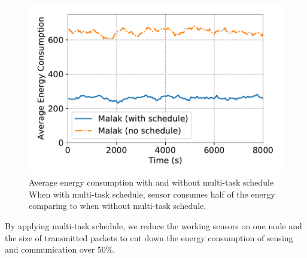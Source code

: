 \begin{figure}[htbp]
	\centering
	\includegraphics[width=.95\columnwidth]{Figure/multitask_energy}
	\vspace{-0.1in}
	\caption{Average energy consumption with and without multi-task schedule
		\textnormal{When with multi-task schedule, sensor consumes half of the energy
			comparing to when without multi-task schedule.}}
	\label{fig:multitask_energy}
\end{figure}

By applying multi-task schedule, we reduce the working sensors on one node and
the size of transmitted packets to cut down the energy consumption of sensing
and communication over 50\%.

